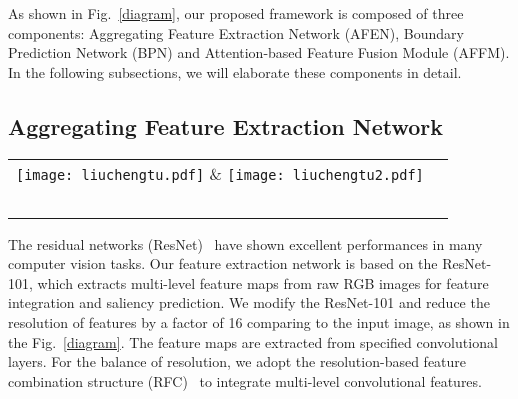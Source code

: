 \documentclass[journal]{IEEEtran}
\begin{document}
As shown in Fig.~\ref{diagram}, our proposed framework is composed of three components: Aggregating Feature Extraction Network (AFEN), Boundary Prediction Network (BPN) and Attention-based Feature Fusion Module (AFFM).
%
In the following subsections, we will elaborate these components in detail.
\vspace{-2mm}
\subsection{Aggregating Feature Extraction Network}
\begin{figure*}[!t]
\centering
\begin{tabular}{@{}c@{}c}
\texttt{[image: liuchengtu.pdf]} \&
\texttt{[image: liuchengtu2.pdf]} \\\
\end{tabular}
\caption{
The overall architecture of our proposed BFANet. The upper stream represents the reproduced Amulet~\cite{Zhang2017Amulet}, which is used to extract multi-level convolutional features.
%
The details of Amulet are described in Section~\ref{sec:AmuletNet for initial prediction}.
%
In another stream, Boundary Prediction Network (BPN) can progressively enlarge the resolution and refine the details of boundary predictions through a cascaded of residual convolution unit (RCU).
%
Attention-based feature fusion module (AFFM) is employed to integrate multi-level features and boundary cues.
%
After that, we obtain multi-level fused feature maps by parallel fused prediction modules (FPM).
%
The final saliency map is produced with the fused feature maps.
\label{diagram}}
\vspace{-5mm}
\end{figure*}
\label{sec:AmuletNet for initial prediction}
The residual networks (ResNet)~\cite{He2016Deep} have shown excellent performances in many computer vision tasks.
%
Our feature extraction network is based on the ResNet-101, which extracts multi-level feature maps from raw RGB images for feature integration and saliency prediction.
%
We modify the ResNet-101 and reduce the resolution of features by a factor of 16 comparing to the input image, as shown in the Fig.~\ref{diagram}.
%
The feature maps are extracted from specified convolutional layers.
%
For the balance of resolution, we adopt the resolution-based feature combination structure (RFC)~\cite{Zhang2017Amulet} to integrate multi-level convolutional features.
\end{document}
